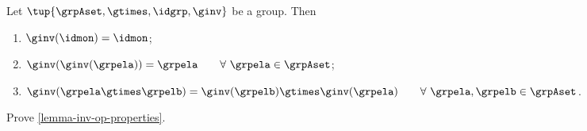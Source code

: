 \begin{lemma}\label{lemma-inv-op-properties}
Let $\tup{\grpAset, \gtimes, \idgrp, \ginv}$ be a group. Then
\begin{enumerate}
\item\label{eq:group-neutral-invariant} $\ginv(\idmon) = \idmon$;
\item\label{eq:group-inverse-inverse}  $ \ginv(\ginv(\grpela)) = \grpela \quad \quad \forall \  \grpela \in \grpAset$;
\item\label{eq:group-inverse-of-composition} $\ginv(\grpela \gtimes \grpelb ) = \ginv(\grpelb) \gtimes \ginv(\grpela) \quad \quad \forall \ \grpela, \grpelb \in \grpAset$.
\end{enumerate}
\end{lemma}

\begin{gradedexercise}
Prove \cref{lemma-inv-op-properties}.
\end{gradedexercise}







